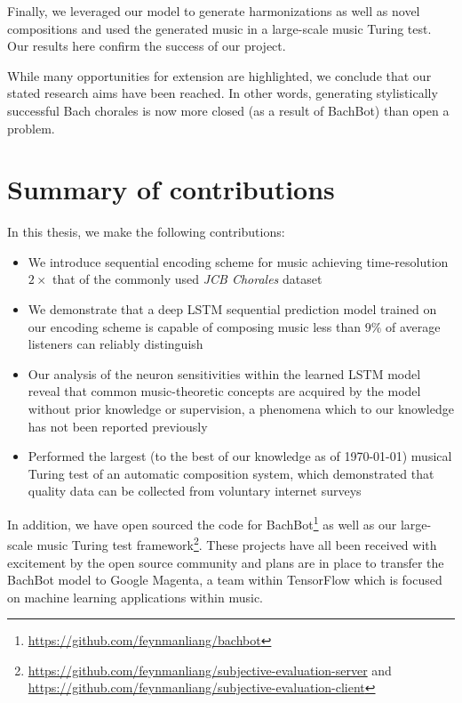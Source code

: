 Finally, we leveraged our model to generate harmonizations as well as novel
compositions and used the generated music in a large-scale music Turing test.
Our results here confirm the success of our project.

While many opportunities for extension are highlighted, we conclude that our
stated research aims have been reached. In other words, generating
stylistically successful Bach chorales is now more closed (as a result of
BachBot) than open a problem.


\section{Summary of contributions}

In this thesis, we make the following contributions:
\begin{itemize}
    \item We introduce sequential encoding scheme for music achieving time-resolution $2\times$
        that of the commonly used \textit{JCB Chorales} \citep{Allan2005} dataset
    \item We demonstrate that a deep LSTM sequential prediction model trained
        on our encoding scheme is capable of composing music less than $9\%$ of
        average listeners can reliably distinguish
    \item Our analysis of the neuron sensitivities within the learned LSTM model
        reveal that common music-theoretic concepts are acquired by the model
        without prior knowledge or supervision, a phenomena which to our
        knowledge has not been reported previously
    \item Performed the largest (to the best of our knowledge as of \today)
        musical Turing test of an automatic composition system, which demonstrated
        that quality data can be collected from voluntary internet surveys
\end{itemize}

In addition, we have open sourced the code for
BachBot\footnote{\url{https://github.com/feynmanliang/bachbot}} as well as our
large-scale music Turing test
framework\footnote{\url{https://github.com/feynmanliang/subjective-evaluation-server}
and \url{https://github.com/feynmanliang/subjective-evaluation-client}}. These
projects have all been received with excitement by the open source community
and plans are in place to transfer the BachBot model to Google Magenta, a team
within TensorFlow \citep{abadi2016tensorflow} which is focused on machine
learning applications within music.

